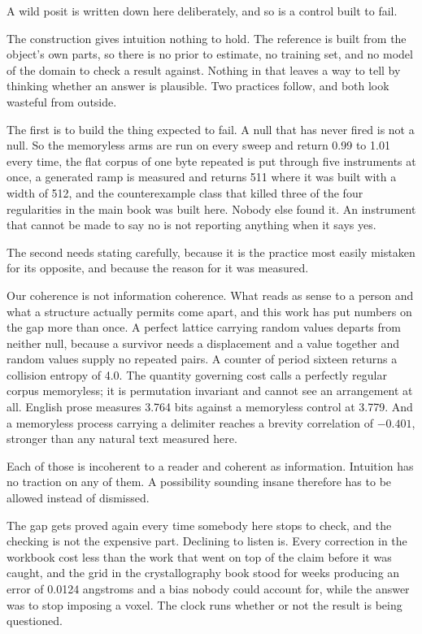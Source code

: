A wild posit is written down here deliberately, and so is a control built to fail.

The construction gives intuition nothing to hold. The reference is built from the object's own parts,
so there is no prior to estimate, no training set, and no model of the domain to check a result
against. Nothing in that leaves a way to tell by thinking whether an answer is plausible. Two
practices follow, and both look wasteful from outside.

The first is to build the thing expected to fail. A null that has never fired is not a null. So the
memoryless arms are run on every sweep and return 0.99 to 1.01 every time, the flat corpus of one
byte repeated is put through five instruments at once, a generated ramp is measured and returns 511
where it was built with a width of 512, and the counterexample class that killed three of the four
regularities in the main book was built here. Nobody else found it. An instrument that
cannot be made to say no is not reporting anything when it says yes.

The second needs stating carefully, because it is the practice most easily mistaken for its opposite,
and because the reason for it was measured.

Our coherence is not information coherence. What reads as sense to a person and what a structure
actually permits come apart, and this work has put numbers on the gap more than once. A perfect
lattice carrying random values departs from neither null, because a survivor needs a displacement and
a value together and random values supply no repeated pairs. A counter of period sixteen returns a
collision entropy of 4.0. The quantity governing cost calls a perfectly regular corpus memoryless;
it is permutation invariant and cannot see an arrangement at all. English prose measures 3.764 bits
against a memoryless control at 3.779. And a memoryless process carrying a delimiter reaches a
brevity correlation of $-0.401$, stronger than any natural text measured here.

Each of those is incoherent to a reader and coherent as information. Intuition has no traction on any
of them. A possibility sounding insane therefore has to be allowed instead of dismissed.

The gap gets proved again every time somebody here stops to check, and the checking is not the
expensive part. Declining to listen is. Every correction in the workbook cost less than the work that
went on top of the claim before it was caught, and the grid in the crystallography book stood for
weeks producing an error of 0.0124 angstroms and a bias nobody could account for, while the answer
was to stop imposing a voxel. The clock runs whether or not the result is being questioned.

